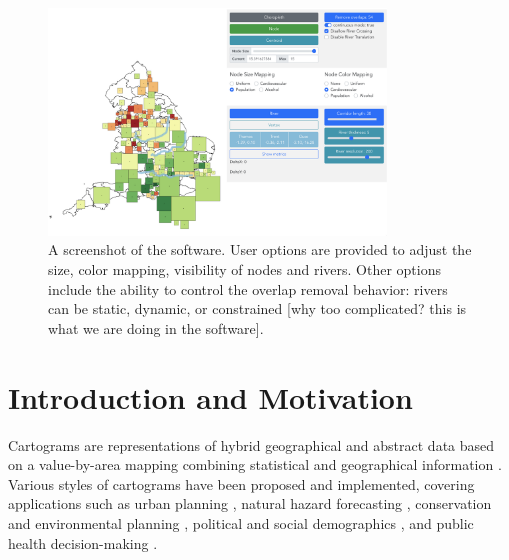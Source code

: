 {
    \begin{figure}[ht!]
        \centering
        \includegraphics[width=0.8\textwidth,keepaspectratio]{figure/UI.png}
        \caption{A screenshot of the software. User options are provided to adjust the size, color mapping, visibility of nodes and rivers. Other options include the ability to control the overlap removal behavior: rivers can be static, dynamic, or constrained [why too complicated? this is what we are doing in the software].}
        \label{fig:overview}
    \end{figure}
}

\section{Introduction and Motivation}

Cartograms are representations of hybrid geographical and abstract data based on a value-by-area mapping combining statistical and geographical information \cite{dent2009Cartography}. Various styles of cartograms have been proposed and implemented, covering applications such as urban planning \cite{harris2018Mapping, arranz-lopez2021Enduser}, natural hazard forecasting \cite{pappenberger2019Cartograms, park2020Flood}, conservation and environmental planning \cite{galluzzi2018Mapping, rocchini2019Cartogramming}, political and social demographics \cite{breitzman2018Using, alieva2021How}, and public health decision-making \cite{gao2020Visualising, sack2021Visualizing}.

